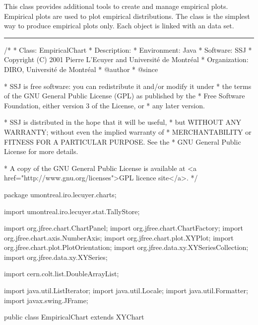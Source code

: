 
This class provides additional tools to create and manage empirical
plots. Empirical plots are used to plot empirical distributions. The
 class is the simplest way to produce empirical
  plots only. Each  object is linked with an
data set.

\bigskip\hrule
\begin{code}
\begin{hide}
/*
 * Class:        EmpiricalChart
 * Description:  
 * Environment:  Java
 * Software:     SSJ 
 * Copyright (C) 2001  Pierre L'Ecuyer and Université de Montréal
 * Organization: DIRO, Université de Montréal
 * @author       
 * @since

 * SSJ is free software: you can redistribute it and/or modify it under
 * the terms of the GNU General Public License (GPL) as published by the
 * Free Software Foundation, either version 3 of the License, or
 * any later version.

 * SSJ is distributed in the hope that it will be useful,
 * but WITHOUT ANY WARRANTY; without even the implied warranty of
 * MERCHANTABILITY or FITNESS FOR A PARTICULAR PURPOSE.  See the
 * GNU General Public License for more details.

 * A copy of the GNU General Public License is available at
   <a href="http://www.gnu.org/licenses">GPL licence site</a>.
 */
\end{hide}
package umontreal.iro.lecuyer.charts;\begin{hide}

import   umontreal.iro.lecuyer.stat.TallyStore;

import   org.jfree.chart.ChartPanel;
import   org.jfree.chart.ChartFactory;
import   org.jfree.chart.axis.NumberAxis;
import   org.jfree.chart.plot.XYPlot;
import   org.jfree.chart.plot.PlotOrientation;
import   org.jfree.data.xy.XYSeriesCollection;
import   org.jfree.data.xy.XYSeries;

import   cern.colt.list.DoubleArrayList;

import   java.util.ListIterator;
import   java.util.Locale;
import   java.util.Formatter;
import   javax.swing.JFrame;\end{hide}

public class EmpiricalChart extends XYChart \begin{hide} {

}
\end{hide}
\end{code}
